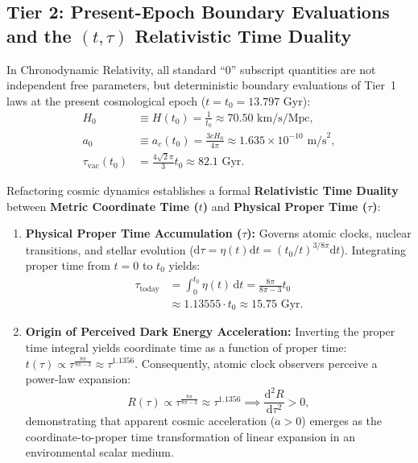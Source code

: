 \documentclass[aps,prd,reprint,superscriptaddress,nofootinbib,floatfix,amsmath,amssymb]{revtex4-2}
\begin{document}
\subsection{Tier 2: Present-Epoch Boundary Evaluations and the \texorpdfstring{$(t, \tau)$}{(t, tau)} Relativistic Time Duality}
\label{sec:tier2_evaluations}

In Chronodynamic Relativity, all standard ``$0$'' subscript quantities are not independent free parameters, but deterministic boundary evaluations of Tier~1 laws at the present cosmological epoch ($t = t_0 = 13.797\text{ Gyr}$):
\begin{align}
H_0 &\equiv H(t_0) = \frac{1}{t_0} \approx 70.50\text{ km/s/Mpc}, \label{eq:eval_h0} \\
a_0 &\equiv a_c(t_0) = \frac{3 c H_0}{4\pi} \approx 1.635 \times 10^{-10}\text{ m/s}^2, \label{eq:eval_a0} \\
\tau_{\text{vac}}(t_0) &= \frac{4\sqrt{2}\pi}{3} t_0 \approx 82.1\text{ Gyr}. \label{eq:eval_tauvac}
\end{align}

Refactoring cosmic dynamics establishes a formal \textbf{Relativistic Time Duality} between \textbf{Metric Coordinate Time ($t$)} and \textbf{Physical Proper Time ($\tau$)}:
\begin{enumerate}
    \item \textbf{Physical Proper Time Accumulation ($\tau$):} Governs atomic clocks, nuclear transitions, and stellar evolution ($\mathrm{d}\tau = \eta(t) \mathrm{d}t = (t_0/t)^{3/8\pi} \mathrm{d}t$). Integrating proper time from $t=0$ to $t_0$ yields:
    \begin{align}
    \tau_{\text{today}} &= \int_0^{t_0} \eta(t) \, \mathrm{d}t = \frac{8\pi}{8\pi - 3} t_0 \nonumber \\
    &\approx 1.13555 \cdot t_0 \approx 15.75\text{ Gyr}.
    \label{eq:proper_time}
    \end{align}
    \item \textbf{Origin of Perceived Dark Energy Acceleration:} Inverting the proper time integral yields coordinate time as a function of proper time: $t(\tau) \propto \tau^{\frac{8\pi}{8\pi-3}} \approx \tau^{1.1356}$. Consequently, atomic clock observers perceive a power-law expansion:
    \begin{equation}
    R(\tau) \propto \tau^{\frac{8\pi}{8\pi-3}} \approx \tau^{1.1356} \implies \frac{\mathrm{d}^2 R}{\mathrm{d}\tau^2} > 0,
    \label{eq:proper_acceleration}
    \end{equation}
    demonstrating that apparent cosmic acceleration ($\ddot{a}>0$) emerges as the coordinate-to-proper time transformation of linear expansion in an environmental scalar medium.
\end{enumerate}
\end{document}
